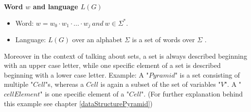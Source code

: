 \begin{DefGrey}\label{wordLanguage} \textbf{Word $w$ and language $L(G)$}
	\begin{itemize}
		\item Word: $w = w_0\cdot w_1\cdot ...\cdot w_j~and~w \in \Sigma^*$.
		\item Language: $L(G)$ over an alphabet $\Sigma$ is a set of words over $\Sigma$ .
	\end{itemize}
\end{DefGrey}
\noindent Moreover in the context of talking about sets, a set is always described beginning with an upper case letter, while one specific element of a set is described beginning with a lower case letter. Example: A "$Pyramid$" is a set consisting of multiple "$Cell$"s, whereas a $Cell$ is again a subset of the set of variables "$V$". A "$cellElement$" is one specific element of a "$Cell$". (For further explanation behind this example see chapter \ref{dataStructurePyramid}) 
